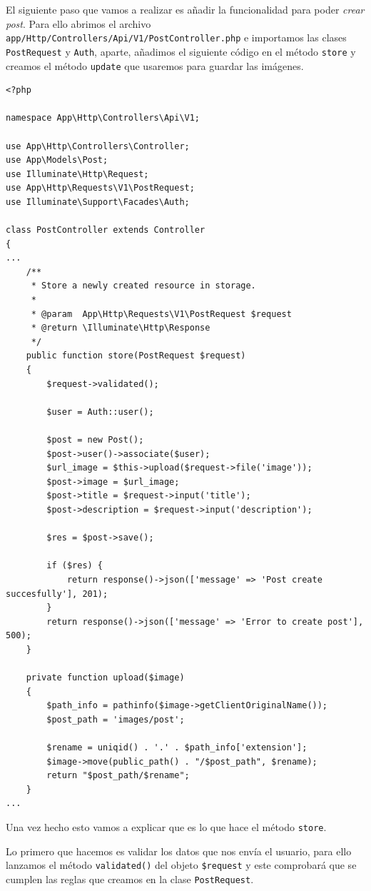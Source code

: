 \documentclass[11pt]{article}
\begin{document}
El siguiente paso que vamos a realizar es añadir la funcionalidad para
poder \emph{crear post}. Para ello abrimos el
archivo \texttt{app/Http/Controllers/Api/V1/PostController.php} e importamos
las clases \texttt{PostRequest} y \texttt{Auth}, aparte, añadimos el siguiente código en
el método \texttt{store} y creamos el método \texttt{update} que usaremos para guardar
las imágenes.
\begin{verbatim}
<?php

namespace App\Http\Controllers\Api\V1;

use App\Http\Controllers\Controller;
use App\Models\Post;
use Illuminate\Http\Request;
use App\Http\Requests\V1\PostRequest;
use Illuminate\Support\Facades\Auth;

class PostController extends Controller
{
...
    /**
     * Store a newly created resource in storage.
     *
     * @param  App\Http\Requests\V1\PostRequest $request
     * @return \Illuminate\Http\Response
     */
    public function store(PostRequest $request)
    {
        $request->validated();

        $user = Auth::user();

        $post = new Post();
        $post->user()->associate($user);
        $url_image = $this->upload($request->file('image'));
        $post->image = $url_image;
        $post->title = $request->input('title');
        $post->description = $request->input('description');

        $res = $post->save();

        if ($res) {
            return response()->json(['message' => 'Post create succesfully'], 201);
        }
        return response()->json(['message' => 'Error to create post'], 500);
    }

    private function upload($image)
    {
        $path_info = pathinfo($image->getClientOriginalName());
        $post_path = 'images/post';

        $rename = uniqid() . '.' . $path_info['extension'];
        $image->move(public_path() . "/$post_path", $rename);
        return "$post_path/$rename";
    }
...
\end{verbatim}

Una vez hecho esto vamos a explicar que es lo que hace el método
\texttt{store}.

Lo primero que hacemos es validar los datos que nos envía el usuario,
para ello lanzamos el método \texttt{validated()} del objeto \texttt{\$request} y este
comprobará que se cumplen las reglas que creamos en la clase
\texttt{PostRequest}.
\end{document}
